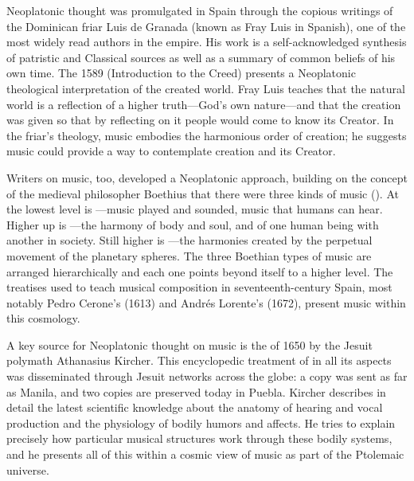 
Neoplatonic thought was promulgated in Spain through the copious writings of
the Dominican friar Luis de Granada (known as Fray Luis in Spanish), one of the
most widely read authors in the empire.%
    \Autocite{Weber:ReligiousLitSpain}
His work is a self-acknowledged synthesis of patristic and Classical
sources as well as a summary of common beliefs of his own time.
The 1589  (Introduction to the Creed)
presents a Neoplatonic theological interpretation of the created world.%
    \Autocites
    {LuisdeGranada-Balcells:SimboloPtI}
    {LuisdeGranada:Simbolo}
Fray Luis teaches that the natural world is a reflection of a higher
truth---God's own nature---and that the creation was given so that by
reflecting on it people would come to know its Creator.
In the friar's theology, music embodies the harmonious order of creation; he
suggests music could provide a way to contemplate creation and its
Creator.


Writers on music, too, developed a Neoplatonic approach, building on the
concept of the medieval philosopher Boethius that there were three kinds of
music ().%
    \Autocite{Boethius:Musica}
At the lowest level is ---music played and sounded,
music that humans can hear.
Higher up is ---the harmony of body and soul, and of one
human being with another in society.
Still higher is ---the harmonies created by the perpetual
movement of the planetary spheres.
The three Boethian types of music are arranged hierarchically and each one
points beyond itself to a higher level.
The treatises used to teach musical composition in seventeenth-century Spain,
most notably Pedro Cerone's  (1613) and Andrés
Lorente's  (1672), present music within this
cosmology.


A key source for Neoplatonic thought on music is the  of 1650 by the Jesuit polymath Athanasius Kircher.%
\Autocite{Kircher:Musurgia}
This encyclopedic treatment of  in all its aspects
was disseminated through Jesuit networks across the globe: a copy was sent as
far as Manila, and two copies are preserved today in Puebla.%
    \Autocites
    {Findlen:Kircher}
    {Godwin:KircherTheater}
    [48--50]{Irving:Colonial}
Kircher describes in detail the latest scientific knowledge about the anatomy
of hearing and vocal production and the physiology of bodily humors and
affects. 
He tries to explain precisely how particular musical structures
work through these bodily systems, and he presents all of this within a cosmic
view of music as part of the Ptolemaic universe.

